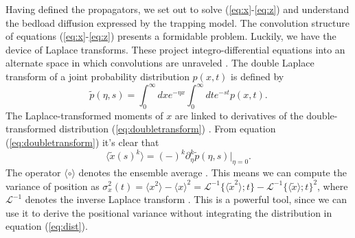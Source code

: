 \documentclass[]{agujournal2018}
\newcommand\be{\begin{equation}}
\newcommand\ee{\end{equation}}
\newcommand\bra{\langle}
\newcommand\ket{\rangle}
\newcommand\El{\mathcal{L}}
\begin{document}
Having defined the propagators, we set out to solve (\ref{eq:x}-\ref{eq:z}) and understand the bedload diffusion expressed by the trapping model.
The convolution structure  of equations (\ref{eq:x}-\ref{eq:z}) presents a formidable problem.
Luckily, we have the device of Laplace transforms.
These project integro-differential equations into an alternate space in which convolutions are unraveled \citep[e.g.][]{Arfken1985}.
The double Laplace transform of a joint probability distribution $p(x,t)$ is defined by 
\be \tilde{p}(\eta,s) = \int_0^\infty dx e^{-\eta x}\int_0^\infty dt e^{-st} p(x,t). \label{eq:doubletransform}\ee
The Laplace-transformed moments of $x$ are linked to derivatives of the double-transformed distribution (\ref{eq:doubletransform}) \citep[cf.][]{Berezhkovskii2002}.
From equation (\ref{eq:doubletransform}) it's clear that
\be \bra \tilde{x}(s)^k \ket = (-)^k\partial_\eta^k \tilde{p}(\eta,s)\Big|_{\eta=0}.\label{eq:momenttrick}\ee
The operator $\bra \circ \ket$ denotes the ensemble average \citep[e.g.][]{Kittel1958}.
This means we can compute the variance of position as $\sigma_x^2(t) = \bra x^2 \ket - \bra x \ket^2 = \El^{-1} \{\bra\tilde{x}^2 \ket;t\} - \El^{-1} \{\bra\tilde{x} \ket;t\}^2$, where $\El^{-1}$ denotes the inverse Laplace transform \citep[e.g.][]{Arfken1985}. This is a powerful tool, since we can use it to derive the positional variance without integrating the distribution in equation (\ref{eq:dist}).
\end{document}
